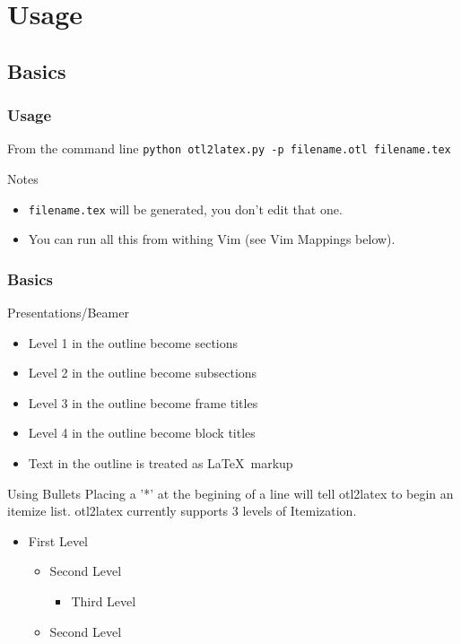 \documentclass[nototal,handout]{beamer}
\begin{document}
\section{Usage} 

\subsection{Basics} 

\begin{frame}
	\frametitle{Usage}
 
\begin{block}{From the command line}
  \texttt{python otl2latex.py -p filename.otl filename.tex}
 
 \end{block} 
\begin{block}{Notes}
 \begin{itemize}
 \item  \texttt{filename.tex} will be generated, you don't edit that one.
 \item  You can run all this from withing Vim (see Vim Mappings below).
 \end{itemize}
 \end{block} \end{frame} 

\begin{frame}
	\frametitle{Basics}
 
\begin{block}{Presentations/Beamer}
 \begin{itemize}
 \item  Level 1 in the outline become sections
 \item  Level 2 in the outline become subsections
 \item  Level 3 in the outline become frame titles
 \item  Level 4 in the outline become block titles
 \item  Text in the outline is treated as \LaTeX\ markup
 \end{itemize}
 \end{block} 
\begin{block}{Using Bullets}
  Placing a '*' at the begining of a line will tell otl2latex to begin an itemize list. otl2latex currently supports 3 levels of Itemization.
 \begin{itemize}
 \item  First Level
 \begin{itemize}
 \item  Second Level
 \begin{itemize}
 \item  Third Level
 \end{itemize}
 \item  Second Level
 \end{itemize}
 \end{itemize}
 \end{block} \end{frame} 
\end{document}
